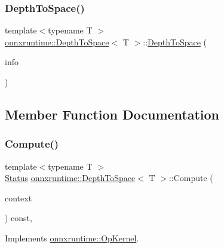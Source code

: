 \subsubsection{\texorpdfstring{Depth\+To\+Space()}{DepthToSpace()}}
{\footnotesize\ttfamily template$<$typename T $>$ \\
\mbox{\hyperlink{classonnxruntime_1_1DepthToSpace}{onnxruntime\+::\+Depth\+To\+Space}}$<$ T $>$\+::\mbox{\hyperlink{classonnxruntime_1_1DepthToSpace}{Depth\+To\+Space}} (\begin{DoxyParamCaption}\item[{const \mbox{\hyperlink{classonnxruntime_1_1OpKernelInfo}{Op\+Kernel\+Info}} \&}]{info }\end{DoxyParamCaption})\hspace{0.3cm}{\ttfamily [inline]}}



\subsection{Member Function Documentation}
\mbox{\label{classonnxruntime_1_1DepthToSpace_a62307a76d073d6835daeca88bc972e20}} 
\subsubsection{\texorpdfstring{Compute()}{Compute()}\hspace{0.1cm}{\footnotesize\ttfamily [1/2]}}
{\footnotesize\ttfamily template$<$typename T $>$ \\
\mbox{\hyperlink{classonnxruntime_1_1common_1_1Status}{Status}} \mbox{\hyperlink{classonnxruntime_1_1DepthToSpace}{onnxruntime\+::\+Depth\+To\+Space}}$<$ T $>$\+::Compute (\begin{DoxyParamCaption}\item[{\mbox{\hyperlink{classonnxruntime_1_1OpKernelContext}{Op\+Kernel\+Context}} $\ast$}]{context }\end{DoxyParamCaption}) const\hspace{0.3cm}{\ttfamily [override]}, {\ttfamily [virtual]}}



Implements \mbox{\hyperlink{classonnxruntime_1_1OpKernel_a9eca8656a78b1b3ab9d3351a12798650}{onnxruntime\+::\+Op\+Kernel}}.

